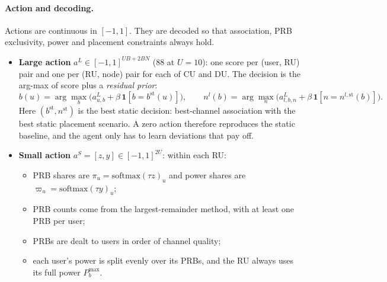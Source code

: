 \documentclass[11pt,oneside]{report}
\begin{document}
\paragraph{Action and decoding.}
Actions are continuous in $[-1,1]$. They are decoded so that association, PRB exclusivity, power and placement constraints always hold.
\begin{itemize}
	\item \textbf{Large action} $a^L\in[-1,1]^{UB+2BN}$ (88 at $U=10$): one score per (user, RU) pair and one per (RU, node) pair for each of CU and DU. The decision is the arg-max of score plus a \emph{residual prior}:
	\begin{equation}\label{eq:decL}
		b(u)=\arg\max_b\big(a^L_{u,b}+\beta\,\mathbf{1}[b=b^{\text{st}}(u)]\big),\qquad
		n^l(b)=\arg\max_n\big(a^L_{l,b,n}+\beta\,\mathbf{1}[n=n^{l,\text{st}}(b)]\big).
	\end{equation}
	Here $(b^{\text{st}},n^{\text{st}})$ is the best static decision: best-channel association with the best static placement scenario.
	A zero action therefore reproduces the static baseline, and the agent only has to learn deviations that pay off.
	\item \textbf{Small action} $a^S=[z,y]\in[-1,1]^{2U}$: within each RU:
	\begin{itemize}
		\item PRB shares are $\pi_u=\mathrm{softmax}(\tau z)_u$ and power shares are $\varpi_u=\mathrm{softmax}(\tau y)_u$;
		\item PRB counts come from the largest-remainder method, with at least one PRB per user;
		\item PRBs are dealt to users in order of channel quality;
		\item each user's power is split evenly over its PRBs, and the RU always uses its full power $P_b^{\max}$.
	\end{itemize}
\end{itemize}
\end{document}
